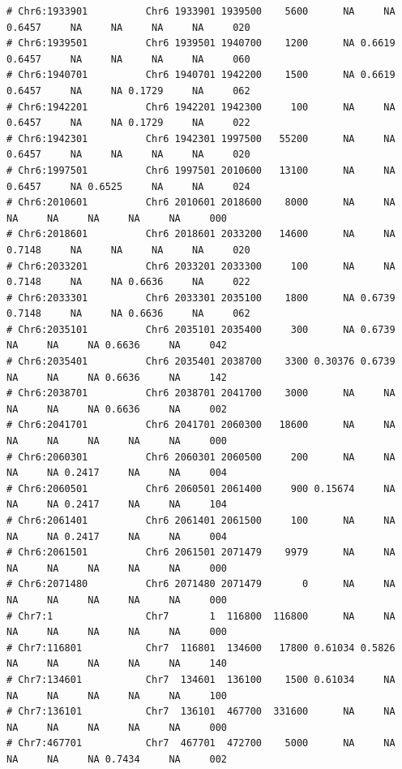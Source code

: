 \documentclass{article}\usepackage[]{graphicx}\usepackage[]{color}
\makeatletter
\newenvironment{kframe}{%
 \def\at@end@of@kframe{}%
 \ifinner\ifhmode%
  \def\at@end@of@kframe{\end{minipage}}%
  \begin{minipage}{\columnwidth}%
 \fi\fi%
 \def\FrameCommand##1{\hskip\@totalleftmargin \hskip-\fboxsep
 \colorbox{shadecolor}{##1}\hskip-\fboxsep
     \hskip-\linewidth \hskip-\@totalleftmargin \hskip\columnwidth}%
 \MakeFramed {\advance\hsize-\width
   \@totalleftmargin\z@ \linewidth\hsize
   \@setminipage}}%
 {\par\unskip\endMakeFramed%
 \at@end@of@kframe}
\newenvironment{knitrout}{}{} %
\makeatother
\begin{document}
\begin{knitrout}
\begin{kframe}
\begin{verbatim}
# Chr6:1933901          Chr6 1933901 1939500    5600      NA     NA 0.6457     NA     NA     NA     NA     020
# Chr6:1939501          Chr6 1939501 1940700    1200      NA 0.6619 0.6457     NA     NA     NA     NA     060
# Chr6:1940701          Chr6 1940701 1942200    1500      NA 0.6619 0.6457     NA     NA 0.1729     NA     062
# Chr6:1942201          Chr6 1942201 1942300     100      NA     NA 0.6457     NA     NA 0.1729     NA     022
# Chr6:1942301          Chr6 1942301 1997500   55200      NA     NA 0.6457     NA     NA     NA     NA     020
# Chr6:1997501          Chr6 1997501 2010600   13100      NA     NA 0.6457     NA 0.6525     NA     NA     024
# Chr6:2010601          Chr6 2010601 2018600    8000      NA     NA     NA     NA     NA     NA     NA     000
# Chr6:2018601          Chr6 2018601 2033200   14600      NA     NA 0.7148     NA     NA     NA     NA     020
# Chr6:2033201          Chr6 2033201 2033300     100      NA     NA 0.7148     NA     NA 0.6636     NA     022
# Chr6:2033301          Chr6 2033301 2035100    1800      NA 0.6739 0.7148     NA     NA 0.6636     NA     062
# Chr6:2035101          Chr6 2035101 2035400     300      NA 0.6739     NA     NA     NA 0.6636     NA     042
# Chr6:2035401          Chr6 2035401 2038700    3300 0.30376 0.6739     NA     NA     NA 0.6636     NA     142
# Chr6:2038701          Chr6 2038701 2041700    3000      NA     NA     NA     NA     NA 0.6636     NA     002
# Chr6:2041701          Chr6 2041701 2060300   18600      NA     NA     NA     NA     NA     NA     NA     000
# Chr6:2060301          Chr6 2060301 2060500     200      NA     NA     NA     NA 0.2417     NA     NA     004
# Chr6:2060501          Chr6 2060501 2061400     900 0.15674     NA     NA     NA 0.2417     NA     NA     104
# Chr6:2061401          Chr6 2061401 2061500     100      NA     NA     NA     NA 0.2417     NA     NA     004
# Chr6:2061501          Chr6 2061501 2071479    9979      NA     NA     NA     NA     NA     NA     NA     000
# Chr6:2071480          Chr6 2071480 2071479       0      NA     NA     NA     NA     NA     NA     NA     000
# Chr7:1                Chr7       1  116800  116800      NA     NA     NA     NA     NA     NA     NA     000
# Chr7:116801           Chr7  116801  134600   17800 0.61034 0.5826     NA     NA     NA     NA     NA     140
# Chr7:134601           Chr7  134601  136100    1500 0.61034     NA     NA     NA     NA     NA     NA     100
# Chr7:136101           Chr7  136101  467700  331600      NA     NA     NA     NA     NA     NA     NA     000
# Chr7:467701           Chr7  467701  472700    5000      NA     NA     NA     NA     NA 0.7434     NA     002

\end{verbatim}
\end{kframe}
\end{knitrout}
\end{document}
